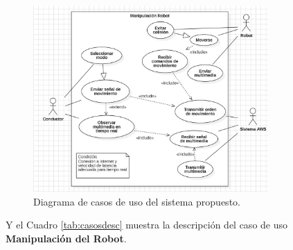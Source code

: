        \vskip 0.5cm
            \begin{figure}[htbp]
                \centering
                \includegraphics[width=0.8\textwidth]{images/desarrollo/diagramas/CasosDeUso.jpeg}
                \caption{Diagrama de casos de uso del sistema propuesto.}
                \label{fig:CasosDeUso}
            \end{figure}
        \vskip 0.5cm
        \clearpage
        Y el Cuadro \ref{tab:casosdesc} muestra la descripci\'on del caso de uso \textbf{Manipulaci\'on del Robot}.
